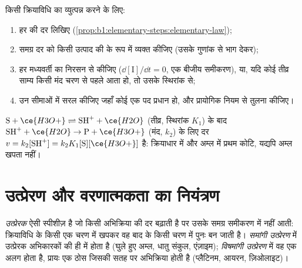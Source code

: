 \begin{method}[क्रियाविधि से दर नियम]\label{met:b1:elementary-steps:rate-law}
किसी क्रियाविधि का  व्युत्पन्न करने के लिए:
\begin{enumerate}
  \item हर  की दर लिखिए (\cref{prop:b1:elementary-steps:elementary-law});
  \item समग्र दर को किसी उत्पाद की  के रूप में व्यक्त कीजिए
        (उसके गुणांक से भाग देकर);
  \item हर मध्यवर्ती का निरसन  से कीजिए
        ($\dd[\mathrm{I}]/\dd t = 0$, एक बीजीय समीकरण), या, यदि कोई तीव्र
        साम्य किसी मंद चरण से पहले आता हो, तो उसके स्थिरांक से;
  \item उन सीमाओं में सरल कीजिए जहाँ कोई एक पद प्रधान हो, और
        प्रायोगिक नियम से तुलना कीजिए।
\end{enumerate}
\end{method}

\begin{example}[एक अम्ल-उत्प्रेरित अभिक्रिया]\label{ex:b1:elementary-steps:acid}
$\mathrm{S} + \ce{H3O+} \rightleftharpoons \mathrm{SH}^+ + \ce{H2O}$ (तीव्र,
स्थिरांक $K_1$) के बाद $\mathrm{SH}^+ + \ce{H2O} \to \mathrm{P} + \ce{H3O+}$ (मंद,
$k_2$) के लिए दर $v = k_2[\mathrm{SH}^+] = k_2K_1[\mathrm{S}][\ce{H3O+}]$ है:
क्रियाधार में और अम्ल में प्रथम कोटि, यद्यपि अम्ल खपता नहीं।
\end{example}

\section{उत्प्रेरण और वरणात्मकता का नियंत्रण}

\begin{definition}[उत्प्रेरक, समांगी और विषमांगी उत्प्रेरण]\label{def:b1:elementary-steps:catalyst}
\emph{उत्प्रेरक} ऐसी स्पीशीज़ है जो किसी अभिक्रिया की दर बढ़ाती है
पर उसके समग्र समीकरण में नहीं आती: क्रियाविधि के किसी एक चरण में
खपकर वह बाद के किसी चरण में पुनः बन जाती है।
\emph{समांगी उत्प्रेरण} में उत्प्रेरक
अभिकारकों की ही  में होता है (घुले हुए अम्ल, धातु संकुल,
एंज़ाइम); \emph{विषमांगी उत्प्रेरण} में
वह एक अलग  होता है, प्रायः एक ठोस जिसकी सतह पर
अभिक्रिया होती है (प्लैटिनम, आयरन, ज़िओलाइट)।
\end{definition}

